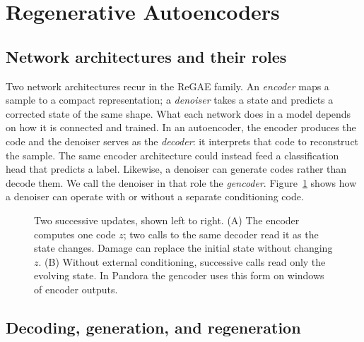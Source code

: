 \section{Regenerative Autoencoders}
\label{sec:method}

\subsection{Network architectures and their roles}

Two network architectures recur in the ReGAE family. An \emph{encoder} maps a sample to a compact representation; a \emph{denoiser} takes a state and predicts a corrected state of the same shape. What each network does in a model depends on how it is connected and trained. In an autoencoder, the encoder produces the code and the denoiser serves as the \emph{decoder}: it interprets that code to reconstruct the sample. The same encoder architecture could instead feed a classification head that predicts a label. Likewise, a denoiser can generate codes rather than decode them. We call the denoiser in that role the \emph{gencoder}. Figure~\ref{fig:architecture} shows how a denoiser can operate with or without a separate conditioning code.

\begin{figure}[t]
  \centering
  \resizebox{.99\textwidth}{!}{}
  \caption{Two successive updates, shown left to right. (A) The encoder computes one code $z$; two calls to the same decoder read it as the state changes. Damage can replace the initial state without changing $z$. (B) Without external conditioning, successive calls read only the evolving state. In Pandora the gencoder uses this form on windows of encoder outputs.}
  \label{fig:architecture}
\end{figure}

\subsection{Decoding, generation, and regeneration}
\label{sec:direct-map}

